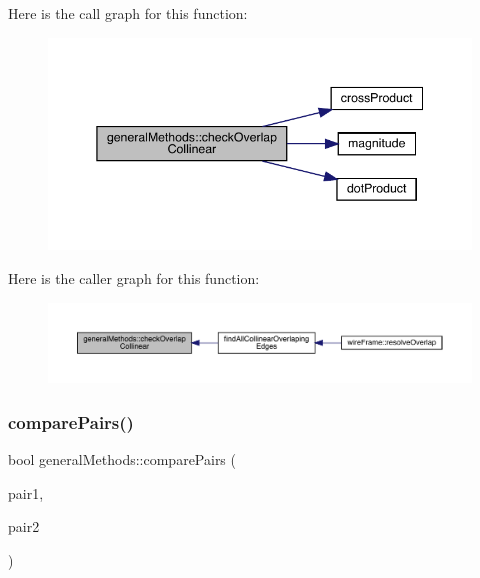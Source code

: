 Here is the call graph for this function\+:
\nopagebreak
\begin{figure}[H]
\begin{center}
\leavevmode
\includegraphics[width=345pt]{namespacegeneral_methods_aa7662b2bcff30f8983da23da5edfc766_cgraph}
\end{center}
\end{figure}
Here is the caller graph for this function\+:
\nopagebreak
\begin{figure}[H]
\begin{center}
\leavevmode
\includegraphics[width=350pt]{namespacegeneral_methods_aa7662b2bcff30f8983da23da5edfc766_icgraph}
\end{center}
\end{figure}
\mbox{\label{namespacegeneral_methods_afc8f20af710f8dc24af591015acc1403}} 
\subsubsection{\texorpdfstring{compare\+Pairs()}{comparePairs()}}
{\footnotesize\ttfamily bool general\+Methods\+::compare\+Pairs (\begin{DoxyParamCaption}\item[{\mbox{\hyperlink{structvertex_edge_pair}{vertex\+Edge\+Pair}}}]{pair1,  }\item[{\mbox{\hyperlink{structvertex_edge_pair}{vertex\+Edge\+Pair}}}]{pair2 }\end{DoxyParamCaption})}



